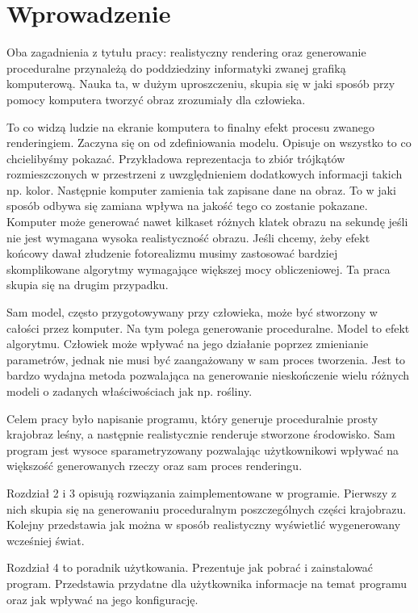 \documentclass[inz,shortabstract]{iithesis}
\author         {Bartosz Rudzki}
\begin{document}
\chapter{Wprowadzenie}
    Oba zagadnienia z tytułu pracy: realistyczny rendering oraz generowanie proceduralne przynależą do poddziedziny informatyki zwanej grafiką komputerową. Nauka ta, w dużym uproszczeniu, skupia się w jaki sposób przy pomocy komputera tworzyć obraz zrozumiały dla człowieka. 
    
    To co widzą ludzie na ekranie komputera to finalny efekt procesu zwanego renderingiem. Zaczyna się on od zdefiniowania modelu. Opisuje on wszystko to co chcielibyśmy pokazać. Przykładowa reprezentacja to zbiór trójkątów rozmieszczonych w przestrzeni z uwzględnieniem dodatkowych informacji takich np. kolor. Następnie komputer zamienia tak zapisane dane na obraz. To w jaki sposób odbywa się zamiana wpływa na jakość tego co zostanie pokazane. Komputer może generować nawet kilkaset różnych klatek obrazu na sekundę jeśli nie jest wymagana wysoka realistyczność obrazu. Jeśli chcemy, żeby efekt końcowy dawał złudzenie fotorealizmu musimy zastosować bardziej skomplikowane algorytmy wymagające większej mocy obliczeniowej. Ta praca skupia się na drugim przypadku.  
    
    Sam model, często przygotowywany przy człowieka, może być stworzony w całości przez komputer. Na tym polega generowanie proceduralne. Model to efekt algorytmu. Człowiek może wpływać na jego działanie poprzez zmienianie parametrów, jednak nie musi być zaangażowany w sam proces tworzenia. Jest to bardzo wydajna metoda pozwalająca na generowanie nieskończenie wielu różnych modeli o zadanych właściwościach jak np. rośliny.
    
    Celem pracy było napisanie programu, który generuje proceduralnie prosty krajobraz leśny, a następnie realistycznie renderuje stworzone środowisko.
    Sam program jest wysoce sparametryzowany pozwalając użytkownikowi wpływać na większość generowanych rzeczy oraz sam proces renderingu.
    
    Rozdział 2 i 3 opisują rozwiązania zaimplementowane w programie. Pierwszy z nich skupia się na generowaniu proceduralnym poszczególnych części krajobrazu. Kolejny przedstawia jak można w sposób realistyczny wyświetlić wygenerowany wcześniej świat.
    
    Rozdział 4 to poradnik użytkowania. Prezentuje jak pobrać i zainstalować program. Przedstawia przydatne dla użytkownika informacje na temat programu oraz jak wpływać na jego konfigurację.
    
\end{document}

